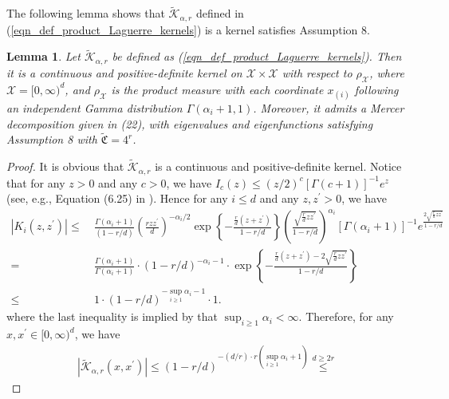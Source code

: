 \documentclass{article}
\theoremstyle{plain}
\newtheorem{lemma}[theorem]{Lemma}
\theoremstyle{definition}
\theoremstyle{remark}
\begin{document}
\begin{appendix}
The following lemma shows that $\tilde{\mathscr{K}}_{\alpha, r}$ defined in (\ref{eqn_def_product_Laguerre_kernels}) is a kernel satisfies Assumption 8.

\begin{lemma}
    Let $\tilde{\mathscr{K}}_{\alpha, r}$ be defined as (\ref{eqn_def_product_Laguerre_kernels}). Then it is a continuous and positive-definite kernel on $\mathcal{X} \times \mathcal{X}$ with respect to $\rho_{\mathcal{X}}$, where $\mathcal{X} = [0, \infty)^d$, and $\rho_{\mathcal{X}}$ is the product measure with each coordinate $x_{(i)}$ following an independent Gamma distribution $\Gamma(\alpha_i + 1, 1)$. Moreover, it admits a Mercer decomposition given in (22), with eigenvalues and eigenfunctions satisfying Assumption 8 with $\tilde{\mathfrak{C}} = 4^r$.
\end{lemma}
\begin{proof}
It is obvious that $\tilde{\mathscr{K}}_{\alpha, r}$ is a continuous and positive-definite kernel. 
\iffalse
Notice that for any $z>0$ and any $c>0$, we have $I_{c}(z) \leq (z/2)^{c} [\Gamma(c+1)]^{-1} e^{z}$ (see, e.g., Equation (6.25) in \cite{luke1972inequalities}).
Hence for any $i \leq d$ and any $z, z^{\prime}>0$, we have
\begin{align*}
    |K_{i}(z, z^{\prime})| \leq &~
 \frac{\Gamma(\alpha_i+1)}{\left(1- r /d\right)}
\left(\frac{r z z^{\prime}}{d}\right)^{-\alpha_i/2}
\exp\left\{-\frac{ \frac{r}{d}(z + z^{\prime})}{1- r / d}\right\}
\left(\frac{\sqrt{ \frac{r}{d}z z^{\prime}}}{1- r /d}\right)^{\alpha_i} [\Gamma(\alpha_i+1)]^{-1} e^{\frac{2\sqrt{ \frac{r}{d}z z^{\prime}}}{1- r /d}}\\
= &~
\frac{ \Gamma(\alpha_i+1)}{\Gamma(\alpha_i+1)} \cdot \left(1- r /d\right)^{-\alpha_i-1} \cdot \exp\left\{-\frac{ \frac{r}{d}(z + z^{\prime}) - 2\sqrt{ \frac{r}{d}z z^{\prime}}}{1- r / d}\right\}\\
\leq &~ 1 \cdot \left(1- r /d\right)^{-\sup_{i \geq 1}\alpha_i -1} \cdot 1.
\end{align*}
where the last inequality is implied by that $\sup_{i \geq 1} \alpha_i < \infty$.
Therefore, for any $x, x^{\prime} \in [0, \infty)^{d}$, we have
\begin{align*}
    |\tilde{\mathscr{K}}_{\alpha, r}(x,x^\prime)| \leq \left(1- r /d\right)^{-(d /r) \cdot r(\sup_{i \geq 1}\alpha_i + 1)} \overset{d \geq 2r}{\leq}

\end{align*}
\end{proof}
\end{appendix}
\end{document}
